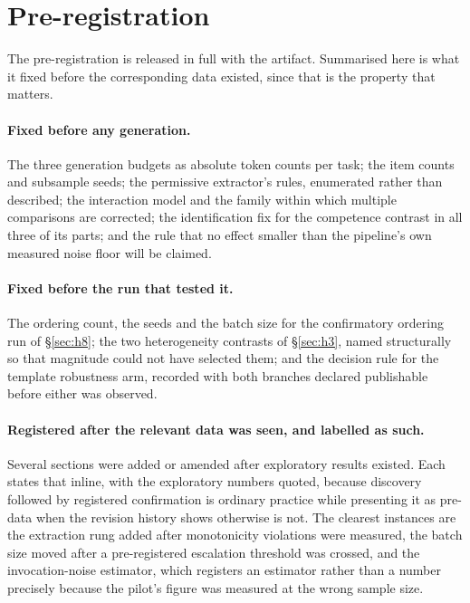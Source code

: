 \documentclass[conference]{IEEEtran}
\begin{document}
\section{Pre-registration}
\label{app:prereg}


The pre-registration is released in full with the artifact. Summarised here is what it
fixed before the corresponding data existed, since that is the property that matters.

\paragraph{Fixed before any generation.} The three generation budgets as absolute token
counts per task; the item counts and subsample seeds; the permissive extractor's rules,
enumerated rather than described; the interaction model and the family within which
multiple comparisons are corrected; the identification fix for the competence contrast in
all three of its parts; and the rule that no effect smaller than the pipeline's own
measured noise floor will be claimed.

\paragraph{Fixed before the run that tested it.} The ordering count, the seeds and the
batch size for the confirmatory ordering run of \S\ref{sec:h8}; the two heterogeneity
contrasts of \S\ref{sec:h3}, named structurally so that magnitude could not have selected
them; and the decision rule for the template robustness arm, recorded with both branches
declared publishable before either was observed.

\paragraph{Registered after the relevant data was seen, and labelled as such.}
Several sections were added or amended after exploratory results existed. Each states
that inline, with the exploratory numbers quoted, because discovery followed by registered
confirmation is ordinary practice while presenting it as pre-data when the revision
history shows otherwise is not. The clearest instances are the extraction rung added after
monotonicity violations were measured, the batch size moved after a pre-registered
escalation threshold was crossed, and the invocation-noise estimator, which registers an
estimator rather than a number precisely because the pilot's figure was measured at the
wrong sample size.
\end{document}
